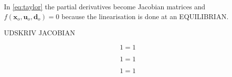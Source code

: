 In \cref{eq:taylor} the partial derivatives become Jacobian matrices and $f(\textbf{x}_o, \textbf{u}_o, \textbf{d}_o) = 0$ because the linearisation is done at an EQUILIBRIAN.

UDSKRIV JACOBIAN

\begin{equation} \label{eq:}
	1=1
\end{equation}

\begin{equation} \label{eq:}
	1=1
\end{equation}

\begin{equation} \label{eq:}
	1=1
\end{equation}